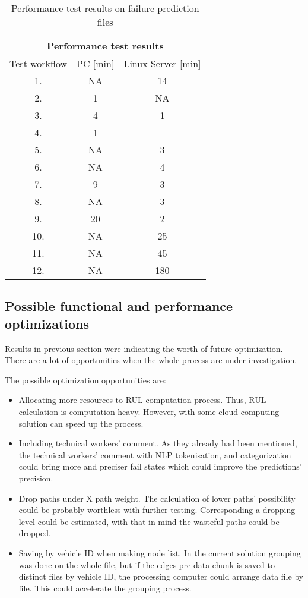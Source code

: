 \begin{table}[H]
\centering
\begin{tabular}{ |c|c|c|  }
\hline
\multicolumn{3}{|c|}{Performance test results} \\
\hline
Test workflow& PC [min] & Linux Server [min]\\
\hline
1.& NA & 14 \\
2.& 1 & NA \\
3.& 4 & 1 \\
4.& 1 & - \\
5.& NA & 3 \\
6.& NA & 4 \\
7.& 9 & 3 \\
8.& NA & 3 \\
9.& 20 & 2 \\
10.& NA & 25 \\
11.& NA & 45 \\
12.& NA & 180 \\
\hline
\end{tabular}
\caption{Performance test results on failure prediction files}
\label{table:3}
\end{table}
\subsection{Possible functional and performance optimizations}
Results in previous section were indicating the worth of future optimization. There are a lot of opportunities when the whole process are under investigation.

The possible optimization opportunities are:
\begin{itemize}
	\item{Allocating more resources to RUL computation process.} Thus, RUL calculation is computation heavy. However, with some cloud computing solution can speed up the process.
	\item{Including technical workers' comment.} As they already had been mentioned, the technical workers' comment with NLP tokenisation, and categorization could bring more and preciser fail states which could improve the predictions' precision.
	\item{Drop paths under X path weight.} The calculation of lower paths' possibility could be probably worthless with further testing. Corresponding a dropping level could be estimated, with that in mind the wasteful paths could be dropped.
	\item{Saving by vehicle ID when making node list.} In the current solution grouping was done on the whole file, but if the edges pre-data chunk is saved to distinct files by vehicle ID, the processing computer could arrange data file by file. This could accelerate the grouping process.
\end{itemize} 
